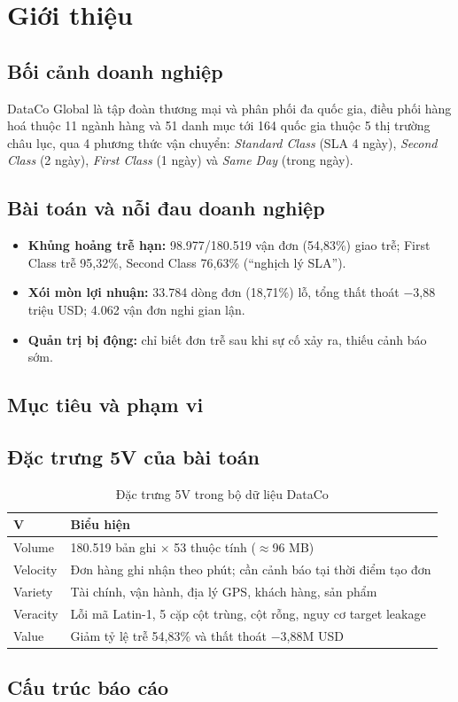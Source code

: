 \chapter{Giới thiệu}
\label{chap:intro}

\section{Bối cảnh doanh nghiệp}
DataCo Global là tập đoàn thương mại và phân phối đa quốc gia, điều phối hàng hoá thuộc
11 ngành hàng và 51 danh mục tới 164 quốc gia thuộc 5 thị trường châu lục, qua 4 phương thức
vận chuyển: \textit{Standard Class} (SLA 4 ngày), \textit{Second Class} (2 ngày),
\textit{First Class} (1 ngày) và \textit{Same Day} (trong ngày).

\section{Bài toán và nỗi đau doanh nghiệp}
\begin{itemize}
  \item \textbf{Khủng hoảng trễ hạn:} 98.977/180.519 vận đơn (54,83\%) giao trễ; First Class trễ 95,32\%, Second Class 76,63\% (``nghịch lý SLA'').
  \item \textbf{Xói mòn lợi nhuận:} 33.784 dòng đơn (18,71\%) lỗ, tổng thất thoát $-$3,88 triệu USD; 4.062 vận đơn nghi gian lận.
  \item \textbf{Quản trị bị động:} chỉ biết đơn trễ sau khi sự cố xảy ra, thiếu cảnh báo sớm.
\end{itemize}

\section{Mục tiêu và phạm vi}

\section{Đặc trưng 5V của bài toán}
\begin{table}[H]
\centering
\caption{Đặc trưng 5V trong bộ dữ liệu DataCo}
\label{tab:5v}
\begin{tabularx}{\linewidth}{lX}
\toprule
\textbf{V} & \textbf{Biểu hiện} \\ \midrule
Volume   & 180.519 bản ghi $\times$ 53 thuộc tính ($\approx$96 MB) \\
Velocity & Đơn hàng ghi nhận theo phút; cần cảnh báo tại thời điểm tạo đơn \\
Variety  & Tài chính, vận hành, địa lý GPS, khách hàng, sản phẩm \\
Veracity & Lỗi mã Latin-1, 5 cặp cột trùng, cột rỗng, nguy cơ target leakage \\
Value    & Giảm tỷ lệ trễ 54,83\% và thất thoát $-$3,88M USD \\
\bottomrule
\end{tabularx}
\end{table}

\section{Cấu trúc báo cáo}
